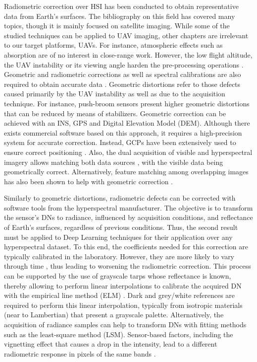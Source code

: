 Radiometric correction over HSI has been conducted to obtain representative data from Earth's surfaces. The bibliography on this field has covered many topics, though it is mainly focused on satellite imaging. While some of the studied techniques can be applied to UAV imaging, other chapters are irrelevant to our target platforms, UAVs. For instance, atmospheric effects such as absorption are of no interest in close-range work. However, the low flight altitude, the UAV instability or its viewing angle harden the pre-processing operations \cite{jakob_need_2017}. Geometric and radiometric corrections as well as spectral calibrations are also required to obtain accurate data \cite{adao_hyperspectral_2017}. Geometric distortions refer to those defects caused primarily by the UAV instability as well as due to the acquisition technique. For instance, push-broom sensors present higher geometric distortions that can be reduced by means of stabilizers. Geometric correction can be achieved with an INS, GPS and Digital Elevation Model (DEM). Although there exists commercial software based on this approach, it requires a high-precision system for accurate correction. Instead, GCPs have been extensively used to ensure correct positioning \cite{ramirez-paredes_low-altitude_2016}. Also, the dual acquisition of visible and hyperspectral imagery allows matching both data sources \cite{jurado_efficient_2021, xue_compact_2021, ramirez-paredes_low-altitude_2016}, with the visible data being geometrically correct. Alternatively, feature matching among overlapping images has also been shown to help with geometric correction \cite{akhoundi_khezrabad_new_2022}.

Similarly to geometric distortions, radiometric defects can be corrected with software tools from the hyperspectral manufacturer. The objective is to transform the sensor's DNs to radiance, influenced by acquisition conditions, and reflectance of Earth's surfaces, regardless of previous conditions. Thus, the second result must be applied to Deep Learning techniques for their application over any hyperspectral dataset. To this end, the coefficients needed for this correction are typically calibrated in the laboratory. However, they are more likely to vary through time \cite{adao_hyperspectral_2017}, thus leading to worsening the radiometric correction. This process can be supported by the use of grayscale tarps whose reflectance is known, thereby allowing to perform linear interpolations to calibrate the acquired DN \cite{lucieer_hyperuasimaging_2014} with the empirical line method (ELM) \cite{aasen_quantitative_2018, sousa_uav-based_2022}. Dark and grey/white references are required to perform this linear interpolation\cite{jakob_need_2017, sagan_data-driven_2022, duan_land_2013}, typically from isotropic materials (near to Lambertian) that present a grayscale palette. Alternatively, the acquisition of radiance samples can help to transform DNs with fitting methods such as the least-square method (LSM). Sensor-based factors, including the vignetting effect that causes a drop in the intensity, lead to a different radiometric response in pixels of the same bands \cite{yang_dom_2017}.

